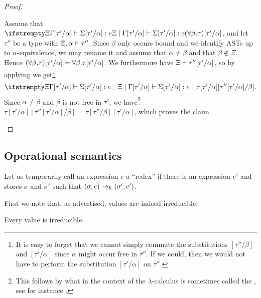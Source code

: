 \begin{proof}
\begin{proofsec}
    \item[\ruleref{TTapp}]
    Assume that $\typerel{\Xi}{\Gamma[\tau'/\alpha]}{\Sigma[\tau'/\alpha]}{e}{\typeForall*{\beta}{\tau}[\tau'/\alpha]}$, and let $\tau''$ be a type with $\Xi,\alpha \vdash \tau''$. Since $\beta$ only occurs bound and we identify ASTs up to $\alpha$-equivalence, we may rename it and assume that $\alpha \neq \beta$ and that $\beta \not\in \Xi$. Hence $\typeForall*{\beta}{\tau}[\tau'/\alpha] = \typeForall{\beta}{\tau[\tau'/\alpha]}$. We furthermore have $\Xi \vdash \tau''[\tau'/\alpha]$, so by applying  we get\footnote{It is easy to forget that we cannot simply commute the substitutions $[\tau''/\beta]$ and $[\tau'/\alpha]$ since $\alpha$ might occur free in $\tau''$. If we could, then we would not have to perform the substitution $[\tau'/\alpha]$ on $\tau''$.}
    \begin{equation*}
        \typerel{\Xi}{\Gamma[\tau'/\alpha]}{\Sigma[\tau'/\alpha]}{\expTapp{e}{\tau''}}{\tau[\tau'/\alpha][\tau''[\tau'/\alpha]/\beta]}.
    \end{equation*}
    Since $\alpha \neq \beta$ and $\beta $ is not free in $\tau'$, we have\footnote{This follows by what in the context of the $\lambda$-calculus is sometimes called the , see for instance \textcite[Lemma~2.1.16]{barendregt-lambda}.} $\tau[\tau'/\alpha][\tau''[\tau'/\alpha]/\beta] = \tau[\tau''/\beta][\tau'/\alpha]$, which proves the claim.
\end{proofsec}
\end{proof}


\subsection{Operational semantics}

Let us temporarily call an expression $e$ a \enquote{redex} if there is an expression $e'$ and stores $\sigma$ and $\sigma'$ such that $(\sigma, e) \to_h (\sigma', e')$.

First we note that, as advertised, values are indeed irreducible:

\begin{proposition}
    \label{prop:value-implies-irreducible}
    Every value is irreducible.
\end{proposition}

